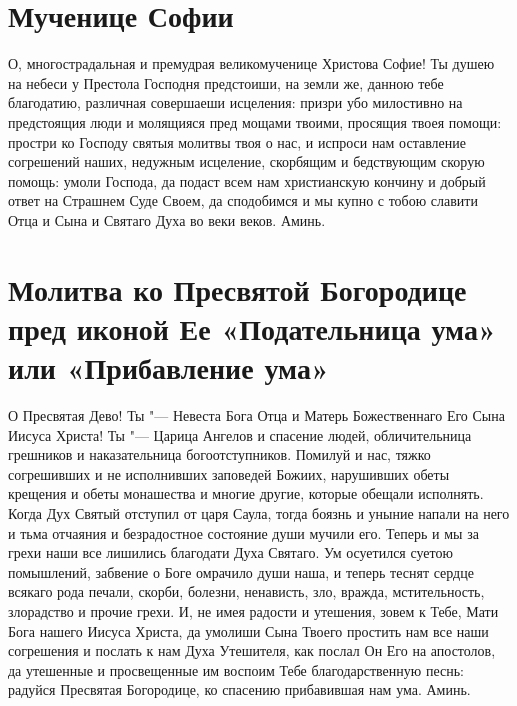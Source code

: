 
 

\section{Мученице Софии}
 


О, многострадальная и премудрая великомученице Христова Софие! Ты душею на небеси у Престола Господня предстоиши, на земли же, данною тебе благодатию, различная совершаеши исцеления: призри убо милостивно на предстоящия люди и молящияся пред мощами твоими, просящия твоея помощи: простри ко Господу святыя молитвы твоя о нас, и испроси нам оставление согрешений наших, недужным исцеление, скорбящим и бедствующим скорую помощь: умоли Господа, да подаст всем нам христианскую кончину и добрый ответ на Страшнем Суде Своем, да сподобимся и мы купно с тобою славити Отца и Сына и Святаго Духа во веки веков. Аминь.
\mychapterending


 

\section{Молитва ко Пресвятой Богородице пред иконой Ее «Подательница ума» или «Прибавление ума»}
 

О Пресвятая Дево! Ты "--- Невеста Бога Отца и Матерь Божественнаго Его Сына Иисуса Христа! Ты "--- Царица Ангелов и спасение людей, обличительница грешников и наказательница богоотступников. Помилуй и нас, тяжко согрешивших и не исполнивших заповедей Божиих, нарушивших обеты крещения и обеты монашества и многие другие, которые обещали исполнять. Когда Дух Святый отступил от царя Саула, тогда боязнь и уныние напали на него и тьма отчаяния и безрадостное состояние души мучили его. Теперь и мы за грехи наши все лишились благодати Духа Святаго. Ум осуетился суетою помышлений, забвение о Боге омрачило души наша, и теперь теснят сердце всякаго рода печали, скорби, болезни, ненависть, зло, вражда, мстительность, злорадство и прочие грехи. И, не имея радости и утешения, зовем к Тебе, Мати Бога нашего Иисуса Христа, да умолиши Сына Твоего простить нам все наши согрешения и послать к нам Духа Утешителя, как послал Он Его на апостолов, да утешенные и просвещенные им воспоим Тебе благодарственную песнь: радуйся Пресвятая Богородице, ко спасению прибавившая нам ума. Аминь.



